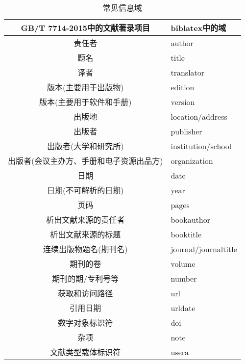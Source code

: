 \begin{table}[!htb]
\centering
\caption{常见信息域}\label{tab:entryfields}
\begin{tabular}{cl}
\hline
  GB/T 7714-2015中的文献著录项目 &  biblatex中的域\\ \hline
  责任者 & author\\
  题名 & title\\
  译者 & translator\\
  版本(主要用于出版物) & edition\\
  版本(主要用于软件和手册) & version\\
  出版地 & location/address\\
  出版者 & publisher\\
  出版者(大学和研究所) & institution/school\\
  出版者(会议主办方、手册和电子资源出品方) & organization\\
  日期 & date\\
  日期(不可解析的日期) & year\\
  页码 & pages\\
  析出文献来源的责任者 & bookauthor\\
  析出文献来源的标题 & booktitle\\
  连续出版物题名(期刊名) & journal/journaltitle\\
  期刊的卷 & volume\\
  期刊的期/专利号等 & number\\
  获取和访问路径 & url\\
  引用日期 & urldate\\
  数字对象标识符 & doi\\
  杂项 & note\\
  文献类型载体标识符 & usera\\
   \hline
  \end{tabular}
\end{table}

